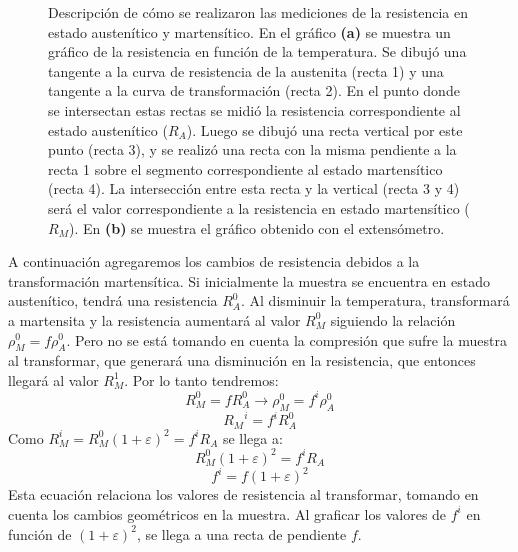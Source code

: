 \documentclass[a4paper,12pt,fleqn,twoside,openany]{book}
\begin{document}
\begin{figure}
    \caption{Descripción de cómo se realizaron las mediciones de la resistencia en estado austenítico y martensítico. En el gráfico \textbf{(a)} se muestra un gráfico de la resistencia en función de la temperatura. Se dibujó una tangente a la curva de resistencia de la austenita (recta 1) y una tangente a la curva de transformación (recta 2). En el punto donde se intersectan estas rectas se midió la resistencia correspondiente al estado austenítico ($R_A$). Luego se dibujó una recta vertical por este punto (recta 3), y se realizó una recta con la misma pendiente a la recta 1 sobre el segmento correspondiente al estado martensítico (recta 4). La intersección entre esta recta  y la vertical (recta 3 y 4) será el valor correspondiente a la resistencia en estado martensítico ($R_M$). En \textbf{(b)} se muestra el gráfico obtenido con el extensómetro.}
    \label{fig:ExpStrainRes}
    \end{figure}


A continuación agregaremos los cambios de resistencia debidos a la transformación martensítica. Si inicialmente la muestra se encuentra en estado austenítico, tendrá una resistencia $R_A^0$. Al disminuir la temperatura, transformará a martensita y la resistencia aumentará al valor $R_M ^0$ siguiendo la relación $\rho_M ^0=f \rho_A ^0$. Pero no se está tomando en cuenta la compresión que sufre la muestra al transformar, que generará una disminución en la resistencia, que entonces llegará al valor ${R_M^1}$. Por lo tanto tendremos:
\begin{equation}
 R_M ^0=fR_A^0   \longrightarrow    \rho_M^0=f^i\rho_A^0 
\end{equation}
\begin{equation}
 {R_M}^{i}=f^{i}R_A ^0
\end{equation}
Como $R_M^{i}=R_M^0 (1+\varepsilon)^2 = f^i R_A$ se llega a:
\begin{equation}
 R_M^0 (1+\varepsilon)^2 = f^{i}R_A
\end{equation}
\begin{equation}
f^{i} = f (1+\varepsilon)^2  \label{fprima}
\end{equation}
Esta ecuación relaciona los valores de resistencia al transformar, tomando en cuenta los cambios geométricos en la muestra. Al graficar los valores de $f^{i}$ en función de $(1+\varepsilon)^2$, se llega a una recta de pendiente $f$. 
  
\end{document}

